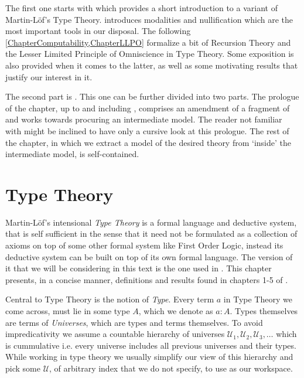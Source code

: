\documentclass[12pt]{report}
\theoremstyle{definition}
\begin{document}
The first one starts with  which provides a short introduction to a variant of Martin-L\"of's Type Theory. 
 introduces modalities and nullification which are the most important tools in our disposal. 
The following \cref{ChapterComputability,ChapterLLPO} formalize a bit of Recursion Theory and the Lesser Limited Principle of Omniscience in Type Theory. 
Some exposition is also provided when it comes to the latter, as well as some motivating results that justify our interest in it. 

The second part is . 
This one can be further divided into two parts. 
The prologue of the chapter, up to and including , comprises an amendment of a fragment of \cite{1905.03014} and works towards procuring an intermediate model. 
The reader not familiar with \cite{1905.03014} might be inclined to have only a cursive look at this prologue. 
The rest of the chapter, in which we extract a model of the desired theory from `inside' the intermediate model, is self-contained. 

\chapter{Type Theory}\label{ChapterTT}
Martin-L\"of's intensional \textit{Type Theory} is a formal language and deductive system, that is self sufficient in the sense that it need not be formulated as a collection of axioms on top of some other formal system like First Order Logic, instead its deductive system can be built on top of its own formal language. 
The version of it that we will be considering in this text is the one used in \cite{hottbook}. 
This chapter presents, in a concise manner, definitions and results found in chapters 1-5 of \cite{hottbook}. 

Central to Type Theory is the notion of \textit{Type}. Every term $a$ in Type Theory we come across, must lie in some type $A$, which we denote as $a : A$. 
Types themselves are terms of \textit{Universes}, which are types and terms themselves. 
To avoid impredicativity we assume a countable hierarchy of universes $\mathcal{U}_1,\mathcal{U}_2,\mathcal{U}_3,\ldots$ which is cummulative i.e. every universe includes all previous universes and their types. 
While working in type theory we usually simplify our view of this hierarchy and pick some $\mathcal{U}$, of arbitrary index that we do not specify, to use as our workspace. 
\end{document}
